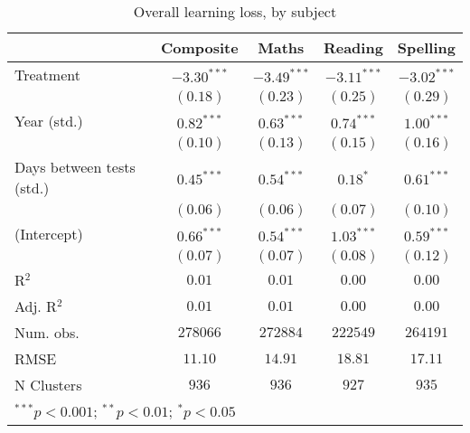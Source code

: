 
\begin{table}
\begin{center}
\begin{tabular}{l c c c c}
\hline
 & Composite & Maths & Reading & Spelling \\
\hline
Treatment                 & $-3.30^{***}$ & $-3.49^{***}$ & $-3.11^{***}$ & $-3.02^{***}$ \\
                          & $(0.18)$      & $(0.23)$      & $(0.25)$      & $(0.29)$      \\
Year (std.)               & $0.82^{***}$  & $0.63^{***}$  & $0.74^{***}$  & $1.00^{***}$  \\
                          & $(0.10)$      & $(0.13)$      & $(0.15)$      & $(0.16)$      \\
Days between tests (std.) & $0.45^{***}$  & $0.54^{***}$  & $0.18^{*}$    & $0.61^{***}$  \\
                          & $(0.06)$      & $(0.06)$      & $(0.07)$      & $(0.10)$      \\
(Intercept)               & $0.66^{***}$  & $0.54^{***}$  & $1.03^{***}$  & $0.59^{***}$  \\
                          & $(0.07)$      & $(0.07)$      & $(0.08)$      & $(0.12)$      \\
\hline
R$^2$                     & $0.01$        & $0.01$        & $0.00$        & $0.00$        \\
Adj. R$^2$                & $0.01$        & $0.01$        & $0.00$        & $0.00$        \\
Num. obs.                 & $278066$      & $272884$      & $222549$      & $264191$      \\
RMSE                      & $11.10$       & $14.91$       & $18.81$       & $17.11$       \\
N Clusters                & $936$         & $936$         & $927$         & $935$         \\
\hline
\multicolumn{5}{l}{\scriptsize{$^{***}p<0.001$; $^{**}p<0.01$; $^{*}p<0.05$}}
\end{tabular}
\caption{Overall learning loss, by subject}
\label{table:overall}
\end{center}
\end{table}
